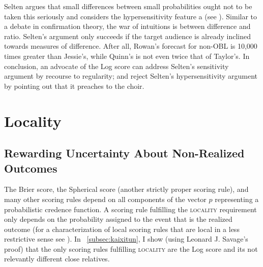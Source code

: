 \documentclass[12pt]{article}
\begin{document}
Selten argues that small differences between small probabilities ought
not to be taken this seriously and considers the hypersensitivity
feature a  (see ).
Similar to a debate in confirmation theory, the war of intuitions is
between difference and ratio.
Selten's argument only succeeds if the target audience is already
inclined towards measures of difference. After all, Rowan's forecast
for non-OBL is 10,000 times greater than Jessie's, while Quinn's is
not even twice that of Taylor's. In conclusion, an advocate of the Log
score can address Selten's sensitivity argument by recourse to
regularity; and reject Selten's hypersensitivity argument by pointing
out that it preaches to the choir.

\section{Locality}
\label{sec:siethohj}

\subsection{Rewarding Uncertainty About Non-Realized Outcomes}
\label{subsec:paivaete}

The Brier score, the Spherical score (another strictly proper scoring
rule), and many other scoring rules depend on all components of the
vector $p$ representing a probabilistic credence function. A scoring
rule fulfilling the \textsc{locality} requirement only depends on the
probability assigned to the event that is the realized outcome (for a
characterization of local scoring rules that are local in a less
restrictive sense see ). In
{\ubsection}~\ref{subsec:kaixitun}, I show (using Leonard J. Savage's
proof) that the only scoring rules fulfilling \textsc{locality} are
the Log score and its not relevantly different close relatives.
\end{document}
